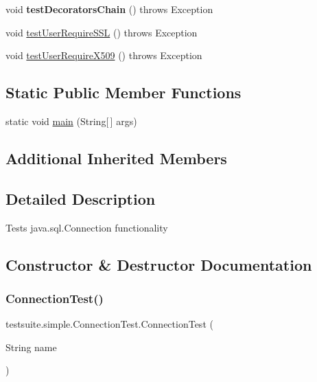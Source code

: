 \begin{DoxyCompactItemize}
\item 
\mbox{\label{classtestsuite_1_1simple_1_1_connection_test_ac015cfb2b5173cb9e4af4d1bd3886c83}} 
void {\bfseries test\+Decorators\+Chain} ()  throws Exception 
\item 
void \mbox{\hyperlink{classtestsuite_1_1simple_1_1_connection_test_a0c148553019aa296f7f80dfc7edf1e49}{test\+User\+Require\+S\+SL}} ()  throws Exception 
\item 
void \mbox{\hyperlink{classtestsuite_1_1simple_1_1_connection_test_a8ccc3af85ebbc2d7b461b32b29d8982c}{test\+User\+Require\+X509}} ()  throws Exception 
\end{DoxyCompactItemize}
\subsection*{Static Public Member Functions}
\begin{DoxyCompactItemize}
\item 
static void \mbox{\hyperlink{classtestsuite_1_1simple_1_1_connection_test_a3f457b435e6cf75f31649400f2ce211d}{main}} (String\mbox{[}$\,$\mbox{]} args)
\end{DoxyCompactItemize}
\subsection*{Additional Inherited Members}


\subsection{Detailed Description}
Tests java.\+sql.\+Connection functionality 

\subsection{Constructor \& Destructor Documentation}
\mbox{\label{classtestsuite_1_1simple_1_1_connection_test_acee3750bd5fb78ce7006ff31f5740a48}} 
\subsubsection{\texorpdfstring{Connection\+Test()}{ConnectionTest()}}
{\footnotesize\ttfamily testsuite.\+simple.\+Connection\+Test.\+Connection\+Test (\begin{DoxyParamCaption}\item[{String}]{name }\end{DoxyParamCaption})}

